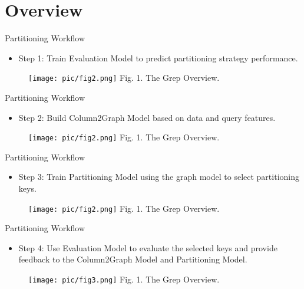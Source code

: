 \documentclass{beamer}
\begin{document}
\section{Overview}
\begin{frame}{Partitioning Workflow}
    \begin{itemize}
        \item Step 1: Train Evaluation Model to predict partitioning strategy performance.
    \end{itemize}
    \begin{figure}[htpb]
        \centering
        \texttt{[image: pic/fig2.png]}
        {Fig. 1. The Grep Overview.}
    \end{figure}
\end{frame}

\begin{frame}{Partitioning Workflow}
    \begin{itemize}
        \item Step 2: Build Column2Graph Model based on data and query features.
    \end{itemize}
    \begin{figure}[htpb]
        \centering
        \texttt{[image: pic/fig2.png]}
        {Fig. 1. The Grep Overview.}
    \end{figure}
\end{frame}

\begin{frame}{Partitioning Workflow}
    \begin{itemize}
        \item Step 3: Train Partitioning Model using the graph model to select partitioning keys.
    \end{itemize}
    \begin{figure}[htpb]
        \centering
        \texttt{[image: pic/fig2.png]}
        {Fig. 1. The Grep Overview.}
    \end{figure}
\end{frame}

\begin{frame}{Partitioning Workflow}
    \begin{itemize}
        \item Step 4: Use Evaluation Model to evaluate the selected keys and provide feedback to the Column2Graph Model and Partitioning Model.
    \end{itemize}
    \begin{figure}[htpb]
        \centering
        \texttt{[image: pic/fig3.png]}
        {Fig. 1. The Grep Overview.}
    \end{figure}
\end{frame}
\end{document}

